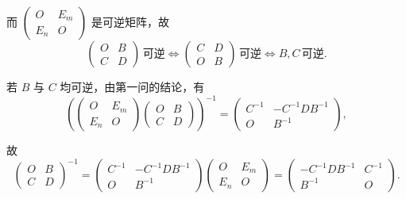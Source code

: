 \begin{exercise}
\begin{exgroup}
\begin{answer}
\begin{enumerate}
                    而 $\begin{pmatrix} O & E_m \\ E_n & O \end{pmatrix}$ 是可逆矩阵，故
                    \[
                        \begin{pmatrix}
                            O & B \\ C & D
                        \end{pmatrix} \, \text{可逆}
                        \iff \begin{pmatrix}
                            C & D \\ O & B
                        \end{pmatrix} \, \text{可逆}
                        \iff B, C \, \text{可逆}.
                    \]

                    若 $B$ 与 $C$ 均可逆，由第一问的结论，有
                    \[
                        \left( \begin{pmatrix}
                            O & E_m \\ E_n & O
                        \end{pmatrix} \begin{pmatrix}
                            O & B \\ C & D
                        \end{pmatrix} \right)^{-1} = \begin{pmatrix}
                            C^{-1} & -C^{-1}DB^{-1} \\ O & B^{-1}
                        \end{pmatrix},
                    \]

                    故
                    \[
                        \begin{pmatrix}
                            O & B \\ C & D
                        \end{pmatrix}^{-1} = \begin{pmatrix}
                            C^{-1} & -C^{-1}DB^{-1} \\ O & B^{-1}
                        \end{pmatrix} \begin{pmatrix}
                            O & E_m \\ E_n & O
                        \end{pmatrix} = \begin{pmatrix}
                            -C^{-1}DB^{-1} & C^{-1} \\ B^{-1} & O
                        \end{pmatrix}.
                    \]


\end{enumerate}
\end{answer}
\end{exgroup}
\end{exercise}
